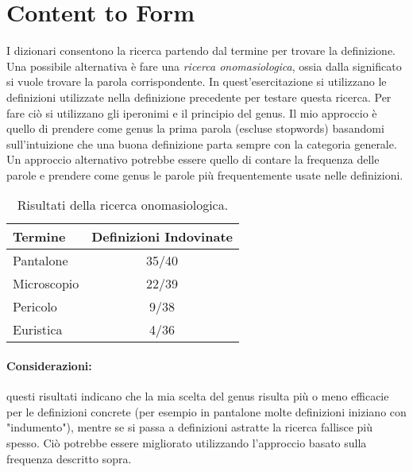\section{Content to Form}

I dizionari consentono la ricerca partendo dal termine per trovare la definizione. Una possibile alternativa è fare una \textit{ricerca onomasiologica}, ossia dalla significato si vuole trovare la parola corrispondente. In quest'esercitazione si utilizzano le definizioni utilizzate nella definizione precedente per testare questa ricerca. Per fare ciò si utilizzano gli iperonimi e il principio del genus. Il mio approccio è quello di prendere come genus la prima parola (escluse stopwords) basandomi sull'intuizione che una buona definizione parta sempre con la categoria generale. Un approccio alternativo potrebbe essere quello di contare la frequenza delle parole e prendere come genus le parole più frequentemente usate nelle definizioni.


\begin{table}[ht]
\centering
\caption{Risultati della ricerca onomasiologica.}
\begin{tabular}{|l|c|}
\hline
Termine & Definizioni Indovinate \\
\hline
Pantalone & 35/40 \\ 
\hline
Microscopio & 22/39 \\ 
\hline
Pericolo & 9/38 \\
\hline
Euristica & 4/36 \\ 
\hline
\end{tabular}
\end{table}

\paragraph{Considerazioni:} questi risultati indicano che la mia scelta del genus risulta più o meno efficacie per le definizioni concrete (per esempio in pantalone molte definizioni iniziano con "indumento"), mentre se si passa a definizioni astratte la ricerca fallisce più spesso. Ciò potrebbe essere migliorato utilizzando l'approccio basato sulla frequenza descritto sopra.


